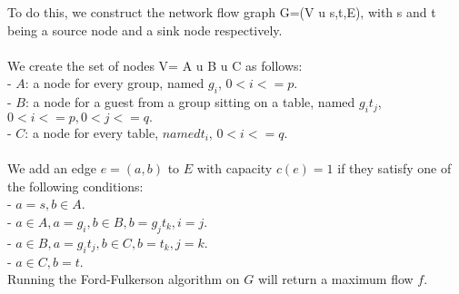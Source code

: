 \documentclass[a4paper,11pt]{article}
\begin{document}
To do this, we construct the network flow graph G=(V u {s,t},E), with s and t being a source node and a sink node respectively. \\\\

We create the set of nodes V= A u B u C as follows:\\
- $A$: a node for every group, named $g_{i}$, $0<i<=p$.\\
- $B$: a node for a guest from a group sitting on a table, named $g_{i}t_{j}$, $0<i<=p, 0<j<=q.$\\
- $C$: a node for every table, $named t_{i}$, $0<i<=q$.\\\\

We add an edge $e=(a,b)$ to $E$ with capacity $c(e)=1$ if they satisfy one of the following conditions:\\
- $a=s, b\in{A}$.\\
- $a\in{A}, a=g_{i}, b\in{B}, b=g_{j}t_{k}, i=j$.\\
- $a\in{B}, a=g_{i}t_{j}, b\in{C}, b=t_{k}, j=k$.\\
- $a\in{C}, b=t$.\\

Running the Ford-Fulkerson algorithm on $G$ will return a maximum flow $f$.
\end{document}
